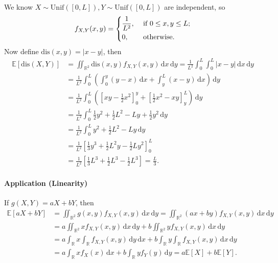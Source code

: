 \begin{explanation}
    We know \(X \sim \mathrm{Unif}([0, L]), Y \sim \mathrm{Unif}([0, L])  \) are independent, so 
    \[
        f_{X, Y}(x, y) = \begin{dcases}
            \frac{1}{L^2}, &\text{ if } 0 \le x, y \le L ;\\
            0, &\text{ otherwise} .
        \end{dcases}
    \]
    Now define \(\mathrm{dis}(x, y) = \vert x - y \vert  \), then 
    \begin{align*}
        \mathbb{E} [\mathrm{dis}(X, Y)] &= \iint_{\mathbb{R} ^2} \mathrm{dis}(x, y) f_{X, Y}(x, y) \, \mathrm{d} x \, \mathrm{d} y = \frac{1}{L^2} \int _0^L \int _0^L \vert x - y \vert \, \mathrm{d} x \, \mathrm{d} y \\
        &= \frac{1}{L^2} \int _0^L \left( \int _0^y (y - x) \, \mathrm{d} x + \int _y^L (x - y) \, \mathrm{d} x   \right) \, \mathrm{d} y \\
        &= \frac{1}{L^2} \int _0^L \left( \left[ xy - \frac{1}{2}x^2 \right]_0^y + \left[ \frac{1}{2}x^2 - xy \right]_y^L   \right) \, \mathrm{d} y \\
        &= \frac{1}{L^2} \int _0^L \frac{1}{2} y^2 + \frac{1}{2} L^2 - Ly + \frac{1}{2} y^2 \, \mathrm{d} y \\
        &= \frac{1}{L^2} \int _0^L y^2 + \frac{1}{2} L^2 - Ly \, \mathrm{d} y \\
        &= \frac{1}{L^2} \left[ \frac{1}{3} y^3 + \frac{1}{2} L^2 y - \frac{1}{2} L y^2 \right]_0^L \\
        &= \frac{1}{L^2} \left[ \frac{1}{3}L^3 + \frac{1}{2} L^3 - \frac{1}{2} L^3 \right] = \frac{L}{3}.             
    \end{align*}

\end{explanation}

\paragraph{Application (Linearity)} If \(g(X, Y) = aX + bY\), then 
\begin{align*}
    \mathbb{E} [aX + bY] &= \iint_{\mathbb{R} ^2} g(x, y) f_{X, Y}(x, y) \, \mathrm{d} x \, \mathrm{d} y = \iint_{\mathbb{R} ^2} (ax + by) f_{X, Y}(x, y) \, \mathrm{d} x \, \mathrm{d} y \\
    &= a \iint_{\mathbb{R} ^2} x f_{X, Y}(x, y) \, \mathrm{d} x \, \mathrm{d} y + b \iint_{\mathbb{R} ^2} y f_{X, Y}(x, y) \, \mathrm{d} x \, \mathrm{d} y \\
    &= a \int _{\mathbb{R} } x \int_{\mathbb{R} } f_{X, Y}(x, y) \, \mathrm{d} y \, \mathrm{d} x + b \int _{\mathbb{R} } y \int _{\mathbb{R} } f_{X, Y}(x, y) \, \mathrm{d} x \, \mathrm{d} y \\
    &= a \int _{\mathbb{R} } x f_X(x) \, \mathrm{d} x + b \int _{\mathbb{R} } y f_Y(y) \, \mathrm{d} y = a \mathbb{E} [X] + b\mathbb{E} [Y].        
\end{align*}


